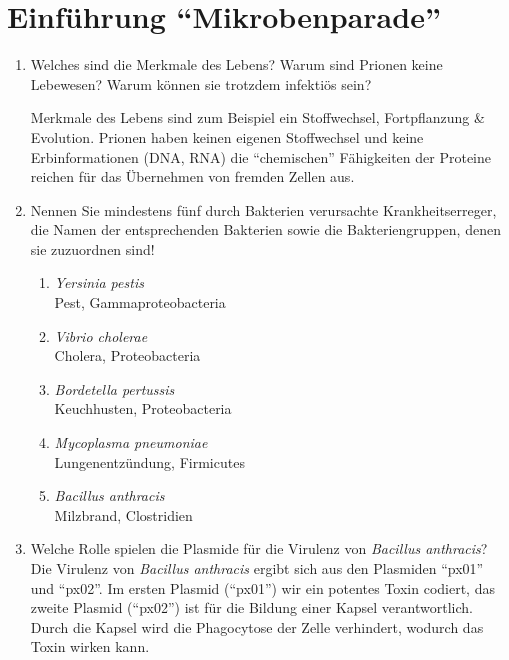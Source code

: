 \section{Einführung ``Mikrobenparade''}
\begin{enumerate}
	\item Welches sind die Merkmale des Lebens? Warum sind Prionen keine Lebewesen? Warum können sie trotzdem infektiös sein? \hfill \vspace{4mm}

	Merkmale des Lebens sind zum Beispiel ein Stoffwechsel, Fortpflanzung \& Evolution.
	Prionen haben keinen eigenen Stoffwechsel und keine Erbinformationen (DNA, RNA)
	die ``chemischen'' Fähigkeiten der Proteine reichen für das Übernehmen von fremden Zellen aus.
	



	\item Nennen Sie mindestens fünf durch Bakterien verursachte Krankheitserreger, die Namen der entsprechenden Bakterien sowie die Bakteriengruppen, denen sie zuzuordnen sind!
		\label{item:boesebakterien}
	\begin{enumerate}[label=\arabic*)]
		\item \emph{Yersinia pestis} \hfill \\
			Pest, Gammaproteobacteria
		\item \emph{Vibrio cholerae} \hfill \\
			Cholera, Proteobacteria
		\item \emph{Bordetella pertussis} \hfill \\
			Keuchhusten, Proteobacteria
		\item \emph{Mycoplasma pneumoniae} \hfill \\
			Lungenentzündung, Firmicutes
		\item \emph{Bacillus anthracis} \hfill \\
			Milzbrand, Clostridien
	\end{enumerate}


	\item Welche Rolle spielen die Plasmide für die Virulenz von \emph{Bacillus anthracis}?  \hfill \vspace{0.2mm} \\

		Die Virulenz von \emph{Bacillus anthracis} ergibt sich
		aus den Plasmiden ``px01'' und ``px02''.
		Im ersten Plasmid (``px01'') wir ein potentes Toxin codiert,
		das zweite Plasmid (``px02'') ist für die Bildung einer Kapsel verantwortlich.
		Durch die Kapsel wird die Phagocytose der Zelle verhindert,
		wodurch das Toxin wirken kann.



\end{enumerate}
